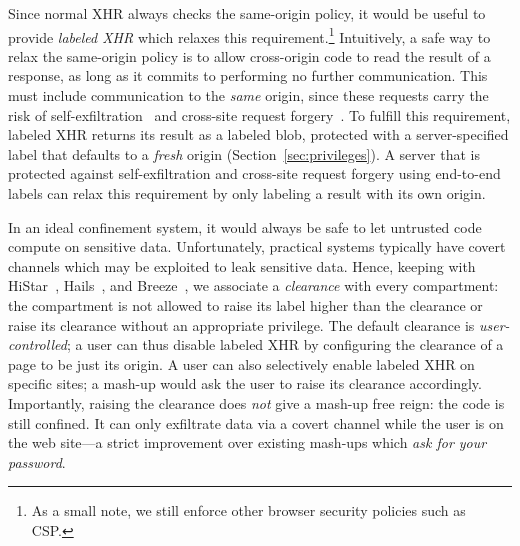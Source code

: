 Since normal XHR always checks the same-origin policy, it would be
useful to provide \emph{labeled XHR} which relaxes this requirement.\footnote{As a small note, we still enforce other browser security policies such as CSP.}
%
Intuitively, a safe way to relax the same-origin policy is to allow
cross-origin code to read the result of a response, as long as it
commits to performing no further communication.
%
This must include communication to the \emph{same} origin, since these requests
carry the risk of self-exfiltration~\cite{selfex} and cross-site request
forgery~\cite{CSRF}.
%
To fulfill this requirement, labeled XHR returns its result as a labeled
blob, protected with a server-specified label that defaults to a \emph{fresh}
origin (Section~\ref{sec:privileges}).
%
A server that is protected against self-exfiltration and cross-site
request forgery using end-to-end labels can relax this requirement by
only labeling a result with its own origin.

In an ideal confinement system, it would always be safe to let untrusted
code compute on sensitive data.
%
Unfortunately, practical systems typically have covert channels which
may be exploited to leak sensitive data.
%
Hence, keeping with HiStar~\cite{Zeldovich:2006},
Hails~\cite{giffin:2012:hails}, and Breeze~\cite{Breeze13}, we associate
a \emph{clearance} with every compartment: the compartment is not
allowed to raise its label higher than the clearance or raise its
clearance without an appropriate privilege.
%
The default clearance is \emph{user-controlled}; a user can thus disable
labeled XHR by configuring the clearance of a page to be just
its origin.
%
A user can also selectively enable labeled XHR on specific sites; a
mash-up would ask the user to raise its clearance accordingly.
%
Importantly, raising the clearance does \emph{not} give a mash-up free reign:
the code is still confined.
%
It can only exfiltrate data via a covert channel while the user
is on the web site---a strict improvement over existing mash-ups which
\emph{ask for your password}.


